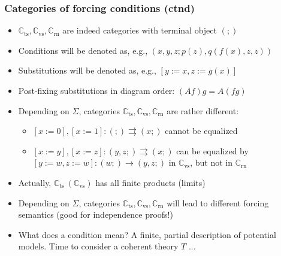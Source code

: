 \documentclass[handout,11pt]{beamer}
\newcommand*{\subvs}{_{\mathrm{vs}}}
\newcommand*{\subrn}{_{\mathrm{rn}}}
\newcommand*{\subts}{_{\mathrm{ts}}}
\newcommand{\Cvs}{\mathbb{C}\subvs}
\newcommand{\Crn}{\mathbb{C}\subrn}
\newcommand{\Cts}{\mathbb{C}\subts}
\begin{document}
\begin{frame}
\frametitle{Categories of forcing conditions (ctnd)}
 \begin{itemize}[<+->]   %
    \item $\Cts,\Cvs,\Crn$ are indeed categories with terminal object $(;)$
    \item Conditions will be denoted as, e.g., $(x,y,z;p(z),q(f(x),z,z))$
    \item Substitutions will be denoted as, e.g., $[y:=x,z:=g(x)]$
    \item Post-fixing substitutions in diagram order: $(Af)g = A(fg)$
    \item Depending on $\Sigma$, categories
    $\Cts,\Cvs,\Crn$ are rather different:
     \begin{itemize}
      \item $[x:=0],[x:=1]:(;)\rightrightarrows(x;)$ cannot be equalized
      \item $[x:=y],[x:=z]:(y,z;)\rightrightarrows(x;)$ can be equalized    
      by $[y:=w,z:=w]:(w;)\to(y,z;)$ in $\Cvs$, but not in $\Crn$
     \end{itemize}
    \item Actually, $\Cts~(\Cvs)$ has all finite products (limits) 
    \item Depending on $\Sigma$, categories $\Cts,\Cvs,\Crn$ will 
    lead to different forcing semantics 
    (good for independence proofs!)
    \item What does a condition mean? A finite, partial description
    of potential models. Time to consider a coherent theory $T$ ...       
 \end{itemize}
\end{frame}
\end{document}
